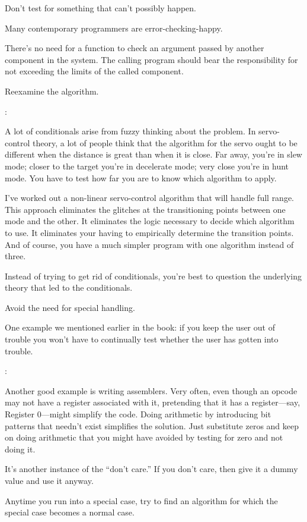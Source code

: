 \begin{tip}
Don't test for something that can't possibly happen.
\end{tip}
Many contemporary programmers are error-checking-happy.

There's no need for a function to check an argument passed by
another component in the system. The calling program should bear the
responsibility for not exceeding the limits of the called component.

\begin{tip}
Reexamine the algorithm.
\end{tip}
\begin{interview}
:
\begin{tfquot}
A lot of conditionals arise from fuzzy thinking about the problem. In
servo-control theory, a lot of people think that the algorithm for the servo
ought to be different when the distance is great than when it is close. Far
away, you're in slew mode; closer to the target you're in decelerate mode;
very close you're in hunt mode. You have to test how far you are to know
which algorithm to apply.

I've worked out a non-linear servo-control algorithm that will handle full
range. This approach eliminates the glitches at the transitioning points
between one mode and the other. It eliminates the logic necessary to decide
which algorithm to use. It eliminates your having to empirically determine
the transition points. And of course, you have a much simpler program with
one algorithm instead of three.

Instead of trying to get rid of conditionals, you're best to question the
underlying theory that led to the conditionals.
\end{tfquot}
\end{interview}%
\begin{tip}
Avoid the need for special handling.
\end{tip}
One example we mentioned earlier in the book: if you keep the user out of
trouble you won't have to continually test whether the user has gotten
into trouble.

\begin{interview}
:
\begin{tfquot}
Another good example is writing assemblers. Very often, even though an
opcode may not have a register associated with it, pretending that it has a
register---say, Register 0---might simplify the code. Doing arithmetic by
introducing bit patterns that needn't exist simplifies the solution. Just
substitute zeros and keep on doing arithmetic that you might have avoided
by testing for zero and not doing it.

It's another instance of the ``don't care.'' If you don't care, then give
it a dummy value and use it anyway.
\end{tfquot}
\end{interview}
Anytime you run into a special case, try to find an algorithm for which
the special case becomes a normal case.

